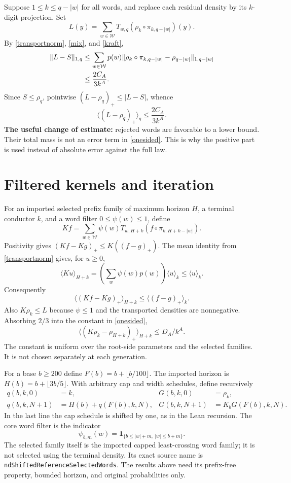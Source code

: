\documentclass[11pt,a4paper]{article}
\theoremstyle{definition}\newtheorem{definition}[theorem]{Definition}
\theoremstyle{remark}\newtheorem{remark}[theorem]{Remark}
\newcommand{\proj}[2]{\pi_{#1,#2}}
\newcommand{\av}[2]{\langle #2\rangle_{#1}}
\newcommand{\normone}[2]{\lVert #2\rVert_{1,#1}}
\newcommand{\code}[1]{{\small\nolinkurl{#1}}}
\begin{document}
Suppose $1\le k\le q-|w|$ for all words, and replace each residual density
by its $k$-digit projection. Set
\[
 L(y)=\sum_{w\in\mathcal W}T_{w,q}
       (\rho_k\circ\proj{k}{q-|w|})(y).
\]
By \eqref{transportnorm}, \eqref{mix}, and \eqref{kraft},
\begin{align}
 \normone q{L-S}
 &\le\sum_{w\in\mathcal W}p(w)
    \normone{q-|w|}{\rho_k\circ\proj{k}{q-|w|}-\rho_{q-|w|}}\notag\\
 &\le \frac{2C_A}{3k^A}.
\end{align}
Since $S\le\rho_q$, pointwise $(L-\rho_q)_+\le |L-S|$, whence
\begin{equation}\label{onesided}
 \av q{(L-\rho_q)_+}\le\frac{2C_A}{3k^A}.
\end{equation}
\textbf{The useful change of estimate:} rejected words are favorable to a
lower bound. Their total mass is not an error term in \eqref{onesided}.
This is why the positive part is used instead of absolute error against
the full law.

\section{Filtered kernels and iteration}
For an imported selected prefix family of maximum horizon $H$, a terminal
conductor $k$, and a word filter $0\le\psi(w)\le1$, define
\begin{equation}\label{kernel}
 Kf=\sum_{w\in\mathcal W}\psi(w)T_{w,H+k}
                  (f\circ\proj{k}{H+k-|w|}).
\end{equation}
Positivity gives $(Kf-Kg)_+\le K((f-g)_+)$. The mean identity from
\eqref{transportnorm} gives, for $u\ge0$,
\[
 \av{H+k}{Ku}=\left(\sum_w\psi(w)p(w)\right)\av ku\le\av ku.
\]
Consequently
\begin{equation}\label{contract}
 \av{H+k}{(Kf-Kg)_+}\le\av k{(f-g)_+}.
\end{equation}
Also $K\rho_k\le L$ because $\psi\le1$ and the transported densities
are nonnegative. Absorbing $2/3$ into the constant in \eqref{onesided},
\begin{equation}\label{onestage}
 \av{H+k}{(K\rho_k-\rho_{H+k})_+}\le D_A/k^A.
\end{equation}
The constant is uniform over the root-side parameters and the selected
families. It is not chosen separately at each generation.

For a base $b\ge200$ define $F(b)=b+\lfloor b/100\rfloor$. The imported
horizon is $H(b)=b+\lfloor3b/5\rfloor$. With arbitrary cap and width
schedules, define recursively
\begin{align*}
 q(b,k,0)&=k,&G(b,k,0)&=\rho_k,\\
 q(b,k,N+1)&=H(b)+q(F(b),k,N),&
 G(b,k,N+1)&=K_bG(F(b),k,N).
\end{align*}
In the last line the cap schedule is shifted by one, as in the Lean
recursion. The core word filter is the indicator
\[
 \psi_{b,m}(w)=\mathbf1_{\{b\le |w|+m,\ |w|\le b+m\}}.
\]
The selected family itself is the imported capped least-crossing word
family; it is not selected using the terminal density. Its exact source
name is \code{ndShiftedReferenceSelectedWords}. The results above need its
prefix-free property, bounded horizon, and original probabilities only.
\end{document}

